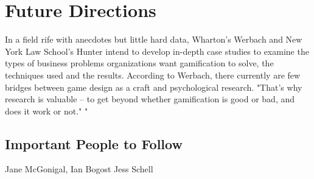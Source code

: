 \chapter{Future Directions}
In a field rife with anecdotes but little hard data, Wharton's Werbach and New York Law School's Hunter intend to develop in-depth case studies to examine the types of business problems organizations want gamification to solve, the techniques used and the results. According to Werbach, there currently are few bridges between game design as a craft and psychological research. "That's why research is valuable -- to get beyond whether gamification is good or bad, and does it work or not."
"

\section{Important People to Follow}
Jane McGonigal, 
Ian Bogost
Jess Schell